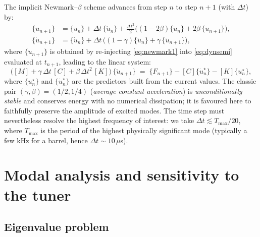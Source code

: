 \documentclass[12pt,a4paper]{article}
\begin{document}
	The implicit Newmark--$\beta$ scheme advances from step $n$ to step $n+1$ (with $\Delta t$) by:
	\begin{align}
		\{u_{n+1}\} &= \{u_n\} + \Delta t\, \{\dot u_n\} + \tfrac{\Delta t^2}{2}\!\big((1-2\beta)\{\ddot u_n\} + 2\beta\,\{\ddot u_{n+1}\}\big), \label{eq:newmark1} \\
		\{\dot u_{n+1}\} &= \{\dot u_n\} + \Delta t\,\big((1-\gamma)\{\ddot u_n\} + \gamma\,\{\ddot u_{n+1}\}\big), \label{eq:newmark2}
	\end{align}
	where $\{\ddot u_{n+1}\}$ is obtained by re-injecting \eqref{eq:newmark1} into \eqref{eq:dynsemi} evaluated at $t_{n+1}$, leading to the linear system:
	\begin{equation}
		\Big([M] + \gamma\,\Delta t\,[C] + \beta\,\Delta t^2\,[K]\Big)\,\{\ddot u_{n+1}\} \;=\; \{F_{n+1}\} - [C]\{\dot u_n^\star\} - [K]\{u_n^\star\},
	\end{equation}
	where $\{u_n^\star\}$ and $\{\dot u_n^\star\}$ are the predictors built from the current values. The classic pair $(\gamma,\beta) = (1/2, 1/4)$ (\emph{average constant acceleration}) is \emph{unconditionally stable} and conserves energy with no numerical dissipation; it is favoured here to faithfully preserve the amplitude of excited modes. The time step must nevertheless resolve the highest frequency of interest: we take $\Delta t \lesssim T_{\max}/20$, where $T_{\max}$ is the period of the highest physically significant mode (typically a few kHz for a barrel, hence $\Delta t \sim 10\,\mu$s).

	\section{Modal analysis and sensitivity to the tuner}
	\label{sec:modale}

	\subsection{Eigenvalue problem}
\end{document}
